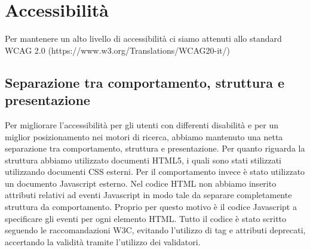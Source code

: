 \documentclass[a4paper]{article}
\begin{document}
	\section{Accessibilità}
	Per mantenere un alto livello di accessibilità ci siamo attenuti allo standard WCAG 2.0 (https://www.w3.org/Translations/WCAG20-it/)

	\subsection{Separazione tra comportamento, struttura e presentazione}
	Per migliorare l'accessibilità per gli utenti con differenti disabilità e per un miglior posizionamento nei motori di ricerca, abbiamo mantenuto una netta separazione tra comportamento, struttura e presentazione. Per quanto riguarda la struttura abbiamo utilizzato documenti HTML5, i quali sono stati stilizzati utilizzando documenti CSS esterni. Per il comportamento invece è stato utilizzato un documento Javascript esterno. Nel codice HTML non abbiamo inserito attributi relativi ad eventi Javascript in modo tale da separare completamente struttura da comportamento. Proprio per questo motivo è il codice Javascript a specificare gli eventi per ogni elemento HTML. Tutto il codice è stato scritto seguendo le raccomandazioni W3C, evitando l'utilizzo di tag e attributi deprecati, accertando la validità tramite l'utilizzo dei validatori.
\end{document}
